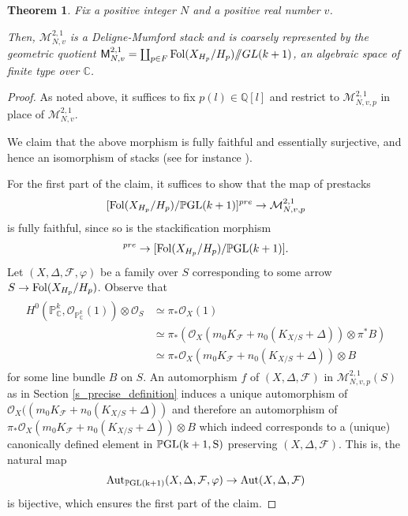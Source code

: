 \documentclass[12pt, a4paper]{amsart}
\newcommand\CC{\mathbb{C}}
\newcommand\PP{\mathbb{P}}
\newcommand\OO{\mathcal{O}}
\newcommand\FF{\mathcal{F}}
\newcounter{Theorem}
\newtheorem{theorem}{Theorem}[section]
\theoremstyle{definition}
\theoremstyle{named}
\begin{document}
\begin{theorem} \label{thm:rep}
    Fix a positive integer $N$
    and a positive real number $v$.
    

         Then, $\mathcal M_{N, v}^{2, 1}$ is a Deligne-Mumford stack and is coarsely represented by the geometric quotient $\mathsf M_{N, v}^{2, 1}=\coprod_{p \in F} {\rm Fol}(X_{H_p}/H_p)/\!\!/GL(k+1)$, an algebraic space of finite type over $\mathbb C$.
\end{theorem}
\begin{proof}
As noted above, it suffices to fix $p(l) \in \mathbb Q[l]$ and restrict to 
$\mathcal M_{N, v, p}^{2, 1}$ in place of $\mathcal M_{N, v}^{2, 1}$.

We claim that the above morphism is fully faithful and essentially surjective, and hence an isomorphism of stacks (see for instance \cite[Proposition 3.1.10]{olsson2016algebraic}).


For the first part of the claim, it suffices to show that the map of prestacks 
$$[{\rm Fol}(X_{H_p}/H_p)/{\rm \PP GL}(k+1)]^{pre}\to \mathcal{M}^{2,1}_{N, v,p}$$
is fully faithful, since so is the stackification morphism \begin{align*}[{\rm Fol}(X_{H_p}/H_p)/{\rm \PP GL}(k+1)]^{pre}\to [{\rm Fol}(X_{H_p}/H_p)/{\rm \PP GL}(k+1)].\end{align*}
Let $(X,\Delta,\FF,\varphi)$ be a family over $S$ corresponding to some arrow $S\to {\rm Fol}(X_{H_p}/H_p)$. Observe that 
\begin{align}\label{eq:iso_polarization}
\begin{split}
    H^0(\PP^k_\CC,\OO_{\PP^k_\CC}(1))\otimes \OO_S&\simeq \pi_*\OO_X(1) \\
    &\simeq \pi_*(\OO_X(m_0 K_\FF + n_0 (K_{X/S}+\Delta))\otimes \pi^*B) \\
    &\simeq \pi_*\OO_X(m_0 K_\FF + n_0 (K_{X/S}+\Delta))\otimes B
\end{split}
\end{align}
for some line bundle $B$ on $S$.
An automorphism $f$ of $(X,\Delta,\FF)$ in $\mathcal M^{2,1}_{N, v,p}(S)$ as in Section \ref{s_precise_definition} induces a unique automorphism of $\OO_X((m_0 K_\FF + n_0 (K_{X/S}+\Delta))$ and therefore an  automorphism of $\pi_*\OO_X(m_0 K_\FF + n_0 (K_{X/S}+\Delta))\otimes B$ 
which indeed corresponds to a (unique) canonically defined element in $\PP \rm GL(k+1,S)$ preserving $(X,\Delta,\FF)$. This is, the natural map 
$${\rm Aut}_{\PP \rm GL(k+1)}(X,\Delta,\FF,\varphi)\to {\rm Aut}(X,\Delta,\FF)$$ is bijective, which ensures the first part of the claim.


\end{proof}
\end{document}
